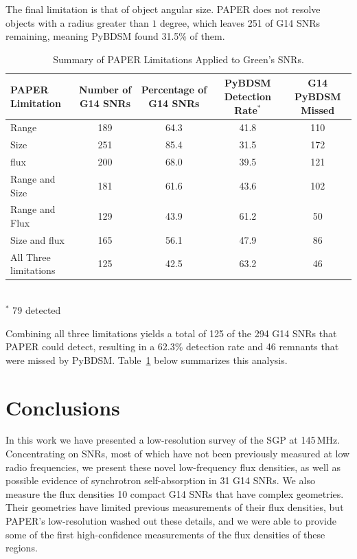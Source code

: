 \documentclass[useAMS,usenatbib]{mn2e}
\begin{document}
The final limitation is that of object angular size.  PAPER does not resolve objects with a radius greater than $1$ degree, which leaves 251 of G14 SNRs remaining, meaning PyBDSM found 31.5\% of them.  

\begin{table}
\caption{Summary of PAPER Limitations Applied to Green's SNRs.}
\begin{tabular}{lcccc}
\hline
PAPER Limitation &	Number of G14 SNRs &	Percentage of G14 SNRs & PyBDSM Detection Rate$^*$ & G14 PyBDSM Missed  \\
\hline
Range 					&	189	&	64.3	&	41.8	&	110 	\\
Size 					&	251	&	85.4 &	31.5	&	172		\\
flux 					&	200 &	68.0 	& 	39.5	&	121     \\
Range and Size 			&   181 &   61.6  &   43.6  &   102  	\\
Range and Flux 			&   129 &   43.9  &   61.2  &   50      \\
Size and flux   		&   165 &   56.1  &   47.9  &   86      \\
All Three limitations   &   125 &   42.5  &   63.2  &   46      \\
\hline
\end{tabular}
\label{tab:Defect}
\\
$^*$ 79 detected
\end{table}

Combining all three limitations yields a total of 125 of the 294 G14 SNRs that PAPER could detect, resulting in a 62.3\% detection rate and 46 remnants that were missed by PyBDSM.  Table~\ref{tab:Defect} below summarizes this analysis.

\section{Conclusions}
\label{sec:conc}

In this work we have presented a low-resolution survey of the SGP at 145\,MHz. Concentrating on SNRs, most of which have not been previously measured at low radio frequencies, we present these novel low-frequency flux densities, as well as possible evidence of synchrotron self-absorption in 31 G14 SNRs. We also measure the flux densities 10 compact G14 SNRs that have complex geometries. Their geometries have limited previous measurements of their flux densities, but PAPER's low-resolution washed out these details, and we were able to provide some of the first high-confidence measurements of the flux densities of these regions.
\end{document}
